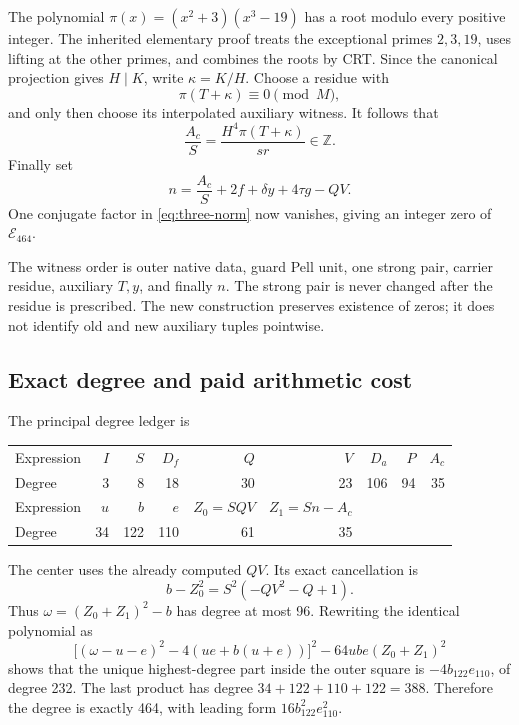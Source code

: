 The polynomial $\pi(x)=(x^2+3)(x^3-19)$ has a root modulo every positive
integer. The inherited elementary proof treats the exceptional primes
$2,3,19$, uses lifting at the other primes, and combines the roots by
CRT. Since the canonical projection gives $H\mid K$, write
$\kappa=K/H$. Choose a residue with
\[
 \pi(T+\kappa)\equiv0\pmod M,
\]
and only then choose its interpolated auxiliary witness. It follows that
\[
 \frac{A_c}{S}=
 \frac{H^4\pi(T+\kappa)}{sr}\in\mathbb Z.
\]
Finally set
\begin{equation}
 n=\frac{A_c}{S}+2f+\delta y+4\tau g-QV.
 \label{eq:choose-n}
\end{equation}
One conjugate factor in \eqref{eq:three-norm} now vanishes, giving an
integer zero of $\mathcal E_{464}$.

The witness order is outer native data, guard Pell unit, one strong
pair, carrier residue, auxiliary $T,y$, and finally $n$. The strong
pair is never changed after the residue is prescribed. The new
construction preserves existence of zeros; it does not identify
old and new auxiliary tuples pointwise.

\subsection{Exact degree and paid arithmetic cost}

The principal degree ledger is
\begin{center}
\begin{tabular}{lrrrrrrrr}
\toprule
Expression &$I$&$S$&$D_f$&$Q$&$V$&$D_a$&$P$&$A_c$\\
Degree &3&8&18&30&23&106&94&35\\
\midrule
Expression &$u$&$b$&$e$&$Z_0=SQV$&$Z_1=Sn-A_c$\\
Degree &34&122&110&61&35\\
\bottomrule
\end{tabular}
\end{center}
The center uses the already computed $QV$. Its exact cancellation is
\begin{equation}
 b-Z_0^2=S^2(-QV^2-Q+1).
 \label{eq:center-cancel}
\end{equation}
Thus $\omega=(Z_0+Z_1)^2-b$ has degree at most 96. Rewriting the
identical polynomial as
\begin{equation}
 \bigl[(\omega-u-e)^2-4(ue+b(u+e))\bigr]^2
       -64ube(Z_0+Z_1)^2
 \label{eq:reduced-degree}
\end{equation}
shows that the unique highest-degree part inside the outer square is
$-4b_{122}e_{110}$, of degree 232. The last product has degree
$34+122+110+122=388$. Therefore the degree is exactly 464, with leading
form $16b_{122}^2e_{110}^2$.

